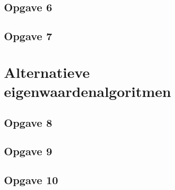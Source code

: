 \documentclass[a4paper, 12pt, titlepage]{report}
\begin{document}
\subsection{Opgave 6}

\subsection{Opgave 7}

\section{Alternatieve eigenwaardenalgoritmen}

\subsection{Opgave 8}

\subsection{Opgave 9}

\subsection{Opgave 10}
\end{document}
